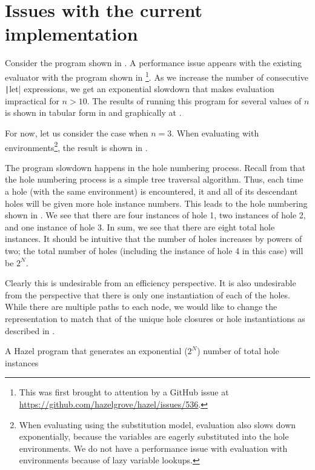 \section{Issues with the current implementation}
\label{sec:current-problems}

Consider the program shown in . A performance issue appears with the existing evaluator with the program shown in \footnote{This was first brought to attention by a GitHub issue at \url{https://github.com/hazelgrove/hazel/issues/536}.}. As we increase the number of consecutive \texttt|let| expressions, we get an exponential slowdown that makes evaluation impractical for $n>10$. The results of running this program for several values of $n$ is shown in tabular form in  and graphically at .

For now, let us consider the case when $n=3$. When evaluating with environments\footnote{When evaluating using the substitution model, evaluation also slows down exponentially, because the variables are eagerly substituted into the hole environments. We do not have a performance issue with evaluation with environments because of lazy variable lookups.}, the result is shown in .

The program slowdown happens in the hole numbering process. Recall from  that the hole numbering process is a simple tree traversal algorithm. Thus, each time a hole (with the same environment) is encountered, it and all of its descendant holes will be given more hole instance numbers. This leads to the hole numbering shown in . We see that there are four instances of hole 1, two instances of hole 2, and one instance of hole 3. In sum, we see that there are eight total hole instances. It should be intuitive that the number of holes increases by powers of two; the total number of holes (including the instance of hole 4 in this case) will be $2^N$.

Clearly this is undesirable from an efficiency perspective. It is also undesirable from the perspective that there is only one instantiation of each of the holes. While there are multiple paths to each node, we would like to change the representation to match that of the unique hole closures or hole instantiations as described in .

\begin{listing}
  \centering
  \caption{A Hazel program that generates an exponential ($2^N$) number of total hole instances}
  \label{fig:hole_renumbering_problem}
\end{listing}

